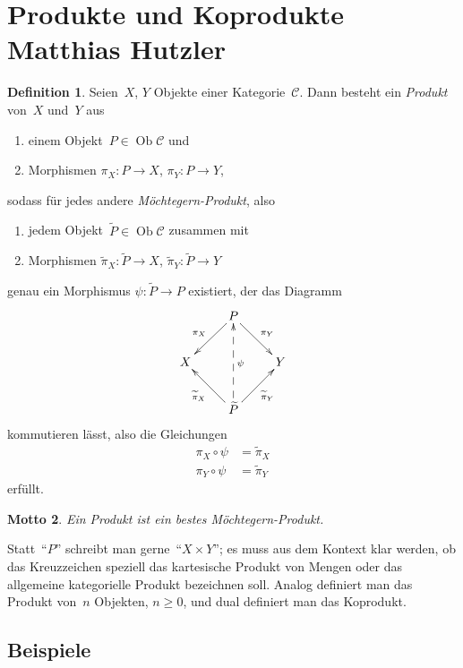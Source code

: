 \documentclass[a4paper,ngerman]{scrartcl}
\theoremstyle{definition}
\newtheorem{defn}{Definition}[section]
\theoremstyle{plain}
\newtheorem{motto}[defn]{Motto}
\theoremstyle{remark}
\newcommand{\C}{\mathcal{C}}
\DeclareMathOperator{\Ob}{Ob}
\begin{document}
\section[Produkte und Koprodukte]{Produkte und Koprodukte \hfill \small
Matthias Hutzler}

\begin{defn}Seien~$X$, $Y$ Objekte einer Kategorie~$\C$. Dann besteht ein
\emph{Produkt} von~$X$ und~$Y$ aus
\begin{enumerate}
\item einem Objekt~$P \in \Ob \C$ und
\item Morphismen $\pi_X : P \to X$, $\pi_Y : P \to Y$,
\end{enumerate}
sodass für jedes andere \emph{Möchtegern-Produkt}, also
\begin{enumerate}
\item jedem Objekt~$\widetilde P \in \Ob \C$ zusammen mit
\item Morphismen $\widetilde \pi_X : \widetilde P \to X$, $\widetilde\pi_Y :
\widetilde P \to Y$
\end{enumerate}
genau ein Morphismus $\psi : \widetilde P \to P$ existiert, der das Diagramm
\[ \xymatrix{
    & P \ar[ld]_{\pi_X} \ar[rd]^{\pi_Y} \\
  X & & Y \\
    & \widetilde P \ar[lu]^{\widetilde \pi_X} \ar@{-->}[uu]_\psi \ar[ru]_{\widetilde \pi_Y}
  } \]
kommutieren lässt, also die Gleichungen
\begin{align*}
  \pi_X \circ \psi &= \widetilde \pi_X \\
  \pi_Y \circ \psi &= \widetilde \pi_Y
\end{align*}
erfüllt.
\end{defn}

\begin{motto}Ein Produkt ist ein bestes Möchtegern-Produkt.\end{motto}

Statt~"`$P$"' schreibt man gerne~"`$X \times Y$"'; es muss aus dem Kontext klar
werden, ob das Kreuzzeichen speziell das kartesische Produkt von Mengen
oder das allgemeine kategorielle Produkt bezeichnen soll.
Analog definiert man das Produkt von~$n$ Objekten, $n \geq 0$, und dual
definiert man das Koprodukt.


\subsection{Beispiele}
\end{document}
